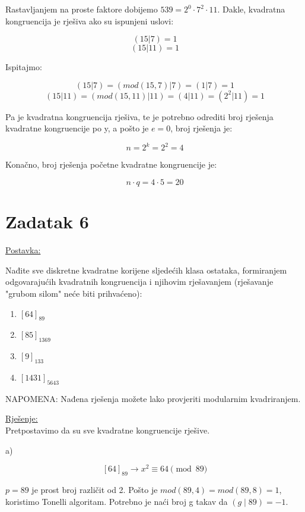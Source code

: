\documentclass[12pt]{article}
\begin{document}
Rastavljanjem na proste faktore dobijemo $539 = 2^0 \cdot 7^2 \cdot 11$. Dakle, kvadratna kongruencija je rješiva ako su ispunjeni uslovi:

$$(15 | 7) = 1$$
$$(15 | 11) = 1$$

Ispitajmo:

$$(15 | 7) = (mod(15, 7) | 7) = (1 | 7) = 1$$
$$(15 | 11) = (mod(15, 11) | 11) = (4 | 11) = (2^2 | 11) = 1$$\vspace{1mm}

Pa je kvadratna kongruencija rješiva, te je potrebno odrediti broj rješenja kvadratne kongruencije po y, a pošto je $e = 0$, broj rješenja je:

$$n = 2^k = 2^2 = 4$$\vspace{1mm}

Konačno, broj rješenja početne kvadratne kongruencije je:

$$n \cdot q = 4 \cdot 5 = 20$$

\newpage

\section*{Zadatak 6\label{Z6} }

\underline{Postavka:}

Nađite sve diskretne kvadratne korijene sljedećih klasa ostataka, formiranjem odgovarajućih kvadratnih kongruencija i njihovim rješavanjem (rješavanje "grubom silom" neće biti prihvaćeno):

\begin{enumerate}
\item $[64]_{89}$
\item $[85]_{1369}$ 
\item $[9]_{133}$
\item $[1431]_{5643}$
\end{enumerate}

NAPOMENA: Nađena rješenja možete lako provjeriti modularnim kvadriranjem.

\underline{Rješenje:}\\

Pretpostavimo da su sve kvadratne kongruencije rješive.\vspace{1mm}

a)

$$[64]_{89} \to x^{2} \equiv 64 \pmod{89}$$\vspace{1mm}

$p = 89$ je prost broj različit od 2. Pošto je $mod(89, 4) = mod(89, 8) = 1$, koristimo Tonelli algoritam. Potrebno je naći broj g takav da $(g\mid89) = -1$.
\end{document}
